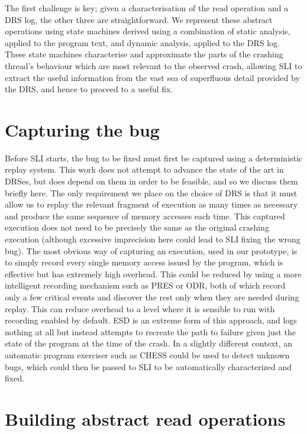 \documentclass[10pt,letter,twocolumn]{sigplanconf}
\newcommand{\editorial}[1]{}
\begin{document}
The first challenge is key; given a characterisation of the read
operation and a DRS log, the other three are straightforward.  We
represent these abstract operations using state machines derived using
a combination of static analysis, applied to the program text, and
dynamic analysis, applied to the DRS log.  These state machines
characterise and approximate the parts of the crashing thread's
behaviour which are most relevant to the observed crash, allowing SLI
to extract the useful information from the vast sea of superfluous
detail provided by the DRS, and hence to proceed to a useful fix.

\section{Capturing the bug}

Before SLI starts, the bug to be fixed must first be captured using a
deterministic replay system.  This work does not attempt to advance
the state of the art in DRSes, but does depend on them in order to be
feasible, and so we discuss them briefly here.  The only requirement
we place on the choice of DRS is that it must allow us to replay the
relevant fragment of execution as many times as necessary and produce
the same sequence of memory accesses each time.  This captured
execution does not need to be precisely the same as the original
crashing execution (although excessive imprecision here could lead to
SLI fixing the wrong bug).  The most obvious way of capturing an
execution, used in our prototype, is to simply record every single
memory access issued by the program, which is effective but has
extremely high overhead.  This could be reduced by using a more
intelligent recording mechanism such as PRES\cite{Park2009} or
ODR\cite{Altekar2009}, both of which record only a few critical events
and discover the rest only when they are needed during replay.  This
can reduce overhead to a level where it is sensible to run with
recording enabled by default.  ESD\cite{Zamfir2010} is an extreme form
of this approach, and logs nothing at all but instead attempts to
recreate the path to failure given just the state of the program at
the time of the crash.  In a slightly different context, an automatic
program exerciser such as CHESS\cite{Musuvathi2008} could be used to
detect unknown bugs, which could then be passed to SLI to be
automatically characterized and fixed.\editorial{I want to use the
  phrase closed-loop here}

\section{Building abstract read operations}
\label{sect:build_state_machines}
\end{document}
